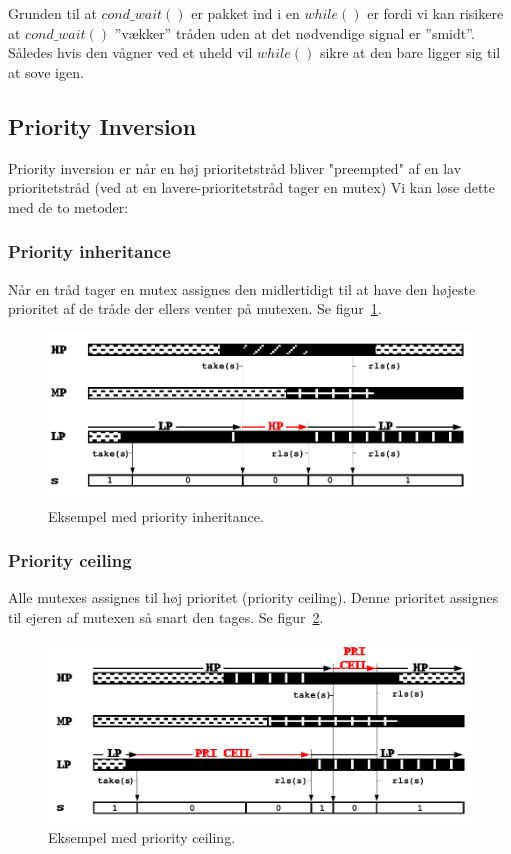 Grunden til at $cond\_wait()$ er pakket ind i en $while()$ er fordi vi kan risikere at $cond\_wait()$ ''vækker'' tråden uden at det nødvendige signal er ''smidt''. Således hvis den vågner ved et uheld vil $while()$ sikre at den bare ligger sig til at sove igen.\\

\subsection{Priority Inversion}
Priority inversion er når en høj prioritetstråd bliver "preempted" af en lav prioritetstråd (ved at en lavere-prioritetstråd tager en mutex)
Vi kan løse dette med de to metoder:

\subsubsection{Priority inheritance}
Når en tråd tager en mutex assignes den midlertidigt til at have den højeste prioritet af de tråde der ellers venter på mutexen. Se figur~\ref{fig:inher}.
	
\begin{figure}[h]
	\centering
	\includegraphics[width=0.8\linewidth]{figs/spm2/inher}
	\caption{Eksempel med priority inheritance.}
	\label{fig:inher}
\end{figure}

\subsubsection{Priority ceiling}
Alle mutexes assignes til høj prioritet (priority ceiling). Denne prioritet assignes til ejeren af mutexen så snart den tages. Se figur~\ref{fig:ceili}.

\begin{figure}[h]
	\centering
	\includegraphics[width=0.8\linewidth]{figs/spm2/ceili}
	\caption{Eksempel med priority ceiling.}
	\label{fig:ceili}
\end{figure}
	
